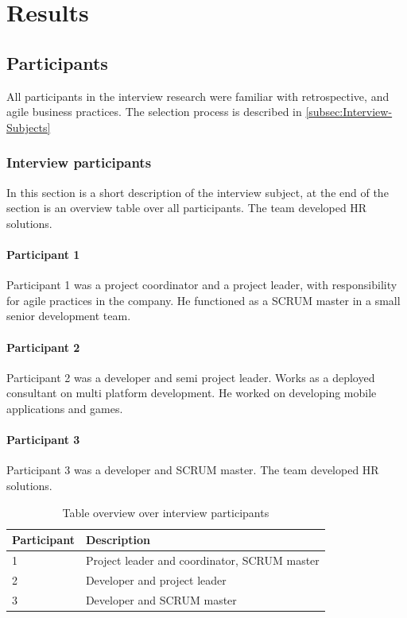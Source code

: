 \chapter{Results}

\clearpage

\section{Participants}
All participants in the interview research were familiar with retrospective, and agile business practices. The selection process is described in \autoref{subsec:Interview-Subjects}


\subsection{Interview participants}
In this section is a short description of the interview subject, at the end of the section is an overview table over all participants. The team developed HR solutions.

\subsubsection{Participant 1}
Participant 1 was a project coordinator and a project leader, with responsibility for agile practices in the company. He functioned as a SCRUM master in a small senior development team.

\subsubsection{Participant 2}
Participant 2 was a developer and semi project leader. Works as a deployed consultant on multi platform development. He worked on developing mobile applications and games.

\subsubsection{Participant 3}
Participant 3 was a developer and SCRUM master. The team developed HR solutions.


\begin{table}[!h]
	\begin{center}
	\caption{Table overview over interview participants}
	\label{table:participants}
	\begin{tabular}{l | p{}}
	\hline
	Participant & Description \\
	\hline
	1 & Project leader and coordinator, SCRUM master \\
	2 & Developer and project leader \\
	3 & Developer and SCRUM master \\
	\hline
	\end{tabular}
	\end{center}
\end{table}


